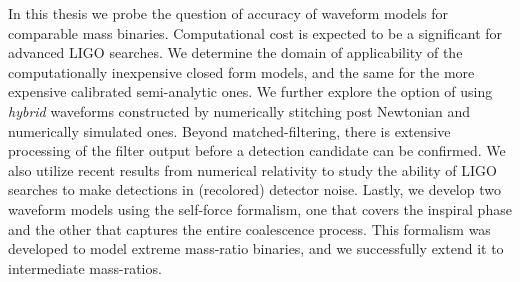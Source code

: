 In this thesis we probe the question of accuracy of waveform models for 
comparable mass binaries. Computational cost is expected to be a significant
for advanced LIGO searches. We determine the domain of applicability of the
computationally inexpensive closed form models, and the same for the more 
expensive calibrated semi-analytic ones. We further explore the option of 
using {\it hybrid} waveforms constructed by numerically stitching post 
Newtonian and numerically simulated ones. Beyond matched-filtering, there 
is extensive processing of the filter output before a detection candidate can
be confirmed. We also utilize recent results from numerical relativity to study
the ability of LIGO searches to make detections in (recolored) detector noise.
Lastly, we develop two waveform models using the self-force formalism, one 
that covers the inspiral phase and the other that captures the entire 
coalescence process. This formalism was developed to model extreme mass-ratio
binaries, and we successfully extend it to intermediate mass-ratios.
